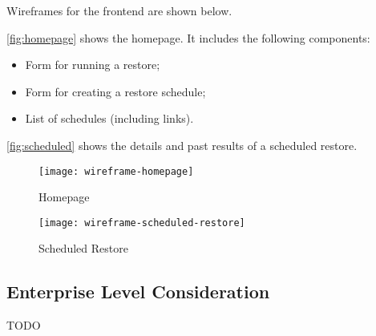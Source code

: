 		Wireframes for the frontend are shown below. 
        
        \autoref{fig:homepage} shows the homepage. It includes the following components:
		\begin{itemize}
			\item Form for running a restore;
			\item Form for creating a restore schedule;
			\item List of schedules (including links).
		\end{itemize}
		\autoref{fig:scheduled} shows the details and past results of a scheduled restore.
		
		
		\begin{figure}[H]
			\setlength{\belowcaptionskip}{15pt plus 3pt minus 2pt}
			\caption{Homepage}
			\centering
			\texttt{[image: wireframe-homepage]}
			\label{fig:homepage}
		\end{figure}
		
		\begin{figure}[H]
			\setlength{\belowcaptionskip}{15pt plus 3pt minus 2pt}
			\caption{Scheduled Restore}
			\centering
			\texttt{[image: wireframe-scheduled-restore]}
			\label{fig:scheduled}
		\end{figure}

	\subsection{Enterprise Level Consideration}
	TODO
	